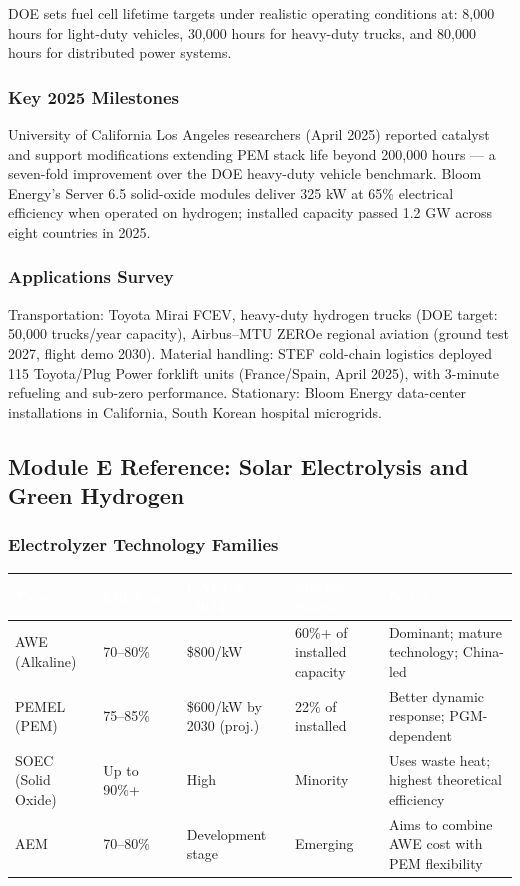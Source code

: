 \documentclass[11pt,letterpaper]{article}
\newcommand{\tableheader}[1]{\textbf{\sffamily\textcolor{white}{#1}}}
\begin{document}
DOE sets fuel cell lifetime targets under realistic operating conditions at: 8,000 hours for light-duty vehicles, 30,000 hours for heavy-duty trucks, and 80,000 hours for distributed power systems.

\subsubsection{Key 2025 Milestones}
University of California Los Angeles researchers (April 2025) reported catalyst and support modifications extending PEM stack life beyond 200,000 hours — a seven-fold improvement over the DOE heavy-duty vehicle benchmark. Bloom Energy's Server 6.5 solid-oxide modules deliver 325 kW at 65\% electrical efficiency when operated on hydrogen; installed capacity passed 1.2 GW across eight countries in 2025.

\subsubsection{Applications Survey}
Transportation: Toyota Mirai FCEV, heavy-duty hydrogen trucks (DOE target: 50,000 trucks/year capacity), Airbus--MTU ZEROe regional aviation (ground test 2027, flight demo 2030). Material handling: STEF cold-chain logistics deployed 115 Toyota/Plug Power forklift units (France/Spain, April 2025), with 3-minute refueling and sub-zero performance. Stationary: Bloom Energy data-center installations in California, South Korean hospital microgrids.

\subsection{Module E Reference: Solar Electrolysis and Green Hydrogen}

\subsubsection{Electrolyzer Technology Families}

\begin{center}
\begin{tabularx}{\textwidth}{L{2.2cm}C{2cm}C{2.2cm}C{2cm}X}
\toprule
{}
\tableheader{Type} & \tableheader{Efficiency} & \tableheader{CAPEX (2024)} & \tableheader{Market Share} & \tableheader{Notes} \\
\midrule
AWE (Alkaline) & 70--80\% & \$800/kW & 60\%+ of installed capacity & Dominant; mature technology; China-led \\
PEMEL (PEM) & 75--85\% & \$600/kW by 2030 (proj.) & 22\% of installed & Better dynamic response; PGM-dependent \\
SOEC (Solid Oxide) & Up to 90\%+ & High & Minority & Uses waste heat; highest theoretical efficiency \\
AEM & 70--80\% & Development stage & Emerging & Aims to combine AWE cost with PEM flexibility \\
\bottomrule
\end{tabularx}
\end{center}
\end{document}
